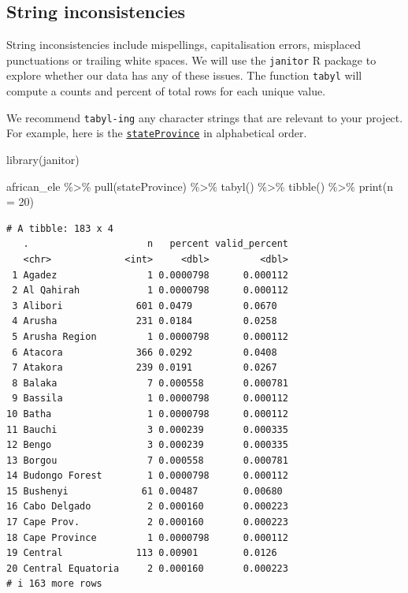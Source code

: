 \documentclass[
  letterpaper,
  DIV=11,
  numbers=noendperiod,
  oneside]{scrreprt}
\newenvironment{Shaded}{\begin{snugshade}}{\end{snugshade}}
\newcommand{\AttributeTok}[1]{\textcolor[rgb]{0.40,0.45,0.13}{#1}}
\newcommand{\DecValTok}[1]{\textcolor[rgb]{0.68,0.00,0.00}{#1}}
\newcommand{\FunctionTok}[1]{\textcolor[rgb]{0.28,0.35,0.67}{#1}}
\newcommand{\NormalTok}[1]{\textcolor[rgb]{0.00,0.23,0.31}{#1}}
\newcommand{\SpecialCharTok}[1]{\textcolor[rgb]{0.37,0.37,0.37}{#1}}
\begin{document}
\hypertarget{string-inconsistencies}{%
\subsection{String inconsistencies}\label{string-inconsistencies}}

String inconsistencies include mispellings, capitalisation errors,
misplaced punctuations or trailing white spaces. We will use the
\texttt{janitor} R package to explore whether our data has any of these
issues. The function \texttt{tabyl} will compute a counts and percent of
total rows for each unique value.

We recommend \texttt{tabyl-ing} any character strings that are relevant
to your project. For example, here is the
\href{https://dwc.tdwg.org/terms/\#dwc:stateProvince}{\texttt{stateProvince}}
in alphabetical order.

\begin{Shaded}
\begin{Highlighting}[]
\FunctionTok{library}\NormalTok{(janitor)}

\NormalTok{african\_ele }\SpecialCharTok{\%\textgreater{}\%}
  \FunctionTok{pull}\NormalTok{(stateProvince) }\SpecialCharTok{\%\textgreater{}\%} 
  \FunctionTok{tabyl}\NormalTok{() }\SpecialCharTok{\%\textgreater{}\%} 
  \FunctionTok{tibble}\NormalTok{() }\SpecialCharTok{\%\textgreater{}\%} 
  \FunctionTok{print}\NormalTok{(}\AttributeTok{n =} \DecValTok{20}\NormalTok{)}
\end{Highlighting}
\end{Shaded}

\begin{verbatim}
# A tibble: 183 x 4
   .                     n   percent valid_percent
   <chr>             <int>     <dbl>         <dbl>
 1 Agadez                1 0.0000798      0.000112
 2 Al Qahirah            1 0.0000798      0.000112
 3 Alibori             601 0.0479         0.0670  
 4 Arusha              231 0.0184         0.0258  
 5 Arusha Region         1 0.0000798      0.000112
 6 Atacora             366 0.0292         0.0408  
 7 Atakora             239 0.0191         0.0267  
 8 Balaka                7 0.000558       0.000781
 9 Bassila               1 0.0000798      0.000112
10 Batha                 1 0.0000798      0.000112
11 Bauchi                3 0.000239       0.000335
12 Bengo                 3 0.000239       0.000335
13 Borgou                7 0.000558       0.000781
14 Budongo Forest        1 0.0000798      0.000112
15 Bushenyi             61 0.00487        0.00680 
16 Cabo Delgado          2 0.000160       0.000223
17 Cape Prov.            2 0.000160       0.000223
18 Cape Province         1 0.0000798      0.000112
19 Central             113 0.00901        0.0126  
20 Central Equatoria     2 0.000160       0.000223
# i 163 more rows
\end{verbatim}
\end{document}
